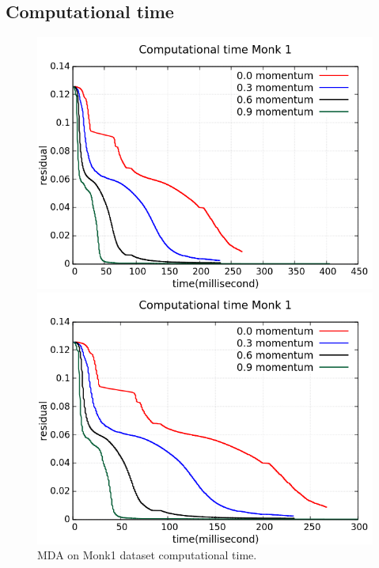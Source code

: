 \subsection{Computational time} 
\begin{figure}[H]
	\centering
	\begin{minipage}[t]{0.5\linewidth}
		\includegraphics[width=\linewidth]{data/MGD/Monk1/M/Monk1_MGD_CT_standard.png}
	\end{minipage}%
	\begin{minipage}[t]{0.5\linewidth}
		\includegraphics[width=\linewidth]{data/MGD/Monk1/M/Monk1_MGD_CT_zoom.png}
	\end{minipage}
	\caption{MDA on Monk1 dataset computational time.}
\end{figure}
